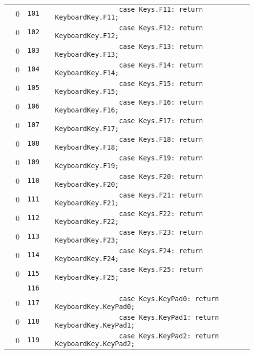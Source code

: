 \documentclass[a4paper,landscape,10pt]{article}
\begin{document}
\begin{longtable}[l]{lrrll}
\cellcolor{red} & 0 & \verb~101~ & & \verb~                case Keys.F11: return KeyboardKey.F11;~\\
\cellcolor{red} & 0 & \verb~102~ & & \verb~                case Keys.F12: return KeyboardKey.F12;~\\
\cellcolor{red} & 0 & \verb~103~ & & \verb~                case Keys.F13: return KeyboardKey.F13;~\\
\cellcolor{red} & 0 & \verb~104~ & & \verb~                case Keys.F14: return KeyboardKey.F14;~\\
\cellcolor{red} & 0 & \verb~105~ & & \verb~                case Keys.F15: return KeyboardKey.F15;~\\
\cellcolor{red} & 0 & \verb~106~ & & \verb~                case Keys.F16: return KeyboardKey.F16;~\\
\cellcolor{red} & 0 & \verb~107~ & & \verb~                case Keys.F17: return KeyboardKey.F17;~\\
\cellcolor{red} & 0 & \verb~108~ & & \verb~                case Keys.F18: return KeyboardKey.F18;~\\
\cellcolor{red} & 0 & \verb~109~ & & \verb~                case Keys.F19: return KeyboardKey.F19;~\\
\cellcolor{red} & 0 & \verb~110~ & & \verb~                case Keys.F20: return KeyboardKey.F20;~\\
\cellcolor{red} & 0 & \verb~111~ & & \verb~                case Keys.F21: return KeyboardKey.F21;~\\
\cellcolor{red} & 0 & \verb~112~ & & \verb~                case Keys.F22: return KeyboardKey.F22;~\\
\cellcolor{red} & 0 & \verb~113~ & & \verb~                case Keys.F23: return KeyboardKey.F23;~\\
\cellcolor{red} & 0 & \verb~114~ & & \verb~                case Keys.F24: return KeyboardKey.F24;~\\
\cellcolor{red} & 0 & \verb~115~ & & \verb~                case Keys.F25: return KeyboardKey.F25;~\\
\cellcolor{gray} &  & \verb~116~ & & \verb~~\\
\cellcolor{red} & 0 & \verb~117~ & & \verb~                case Keys.KeyPad0: return KeyboardKey.KeyPad0;~\\
\cellcolor{red} & 0 & \verb~118~ & & \verb~                case Keys.KeyPad1: return KeyboardKey.KeyPad1;~\\
\cellcolor{red} & 0 & \verb~119~ & & \verb~                case Keys.KeyPad2: return KeyboardKey.KeyPad2;~\\

\end{longtable}
\end{document}
